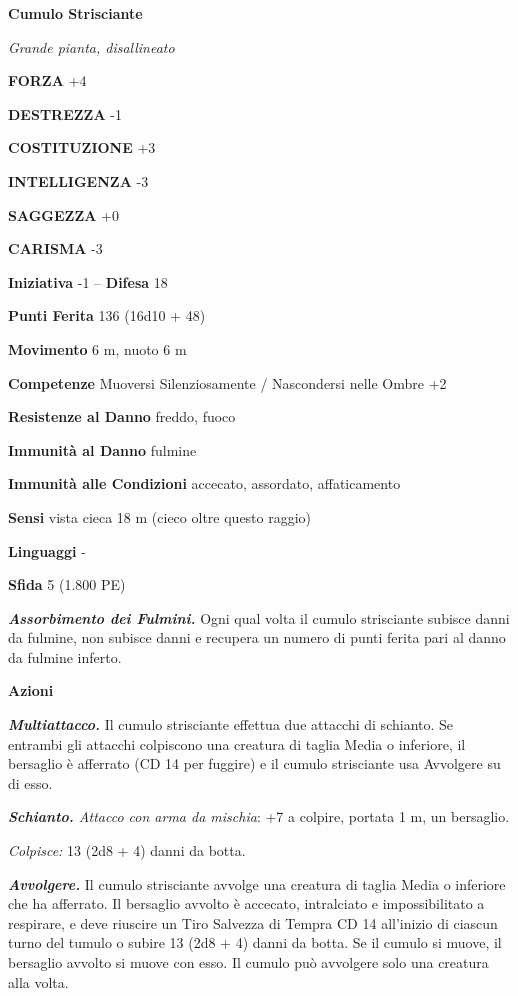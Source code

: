 \begin{multicols}{2}
\medskip{}\textbf{Cumulo Strisciante}

\emph{Grande pianta, disallineato}

\textbf{FORZA} +4

\textbf{DESTREZZA} -1

\textbf{COSTITUZIONE} +3

\textbf{INTELLIGENZA} -3

\textbf{SAGGEZZA} +0

\textbf{CARISMA} -3

\textbf{Iniziativa} -1 -- \textbf{Difesa} 18

\textbf{Punti Ferita} 136 (16d10 + 48)

\textbf{Movimento} 6 m, nuoto 6 m

\textbf{Competenze} Muoversi Silenziosamente / Nascondersi nelle Ombre +2

\textbf{Resistenze al Danno} freddo, fuoco

\textbf{Immunità al Danno} fulmine

\textbf{Immunità alle Condizioni} accecato, assordato, affaticamento

\textbf{Sensi} vista cieca 18 m (cieco oltre questo raggio)

\textbf{Linguaggi} -

\textbf{Sfida} 5 (1.800 PE)

\emph{\textbf{Assorbimento dei Fulmini.}} Ogni qual volta il cumulo strisciante subisce danni da fulmine, non subisce danni e recupera un numero di punti ferita pari al danno da fulmine inferto.

\textbf{Azioni}

\emph{\textbf{Multiattacco.}} Il cumulo strisciante effettua due attacchi di schianto. Se entrambi gli attacchi colpiscono una creatura di taglia Media o inferiore, il bersaglio è afferrato (CD 14 per fuggire) e il cumulo strisciante usa Avvolgere su di esso.

\emph{\textbf{Schianto.} Attacco con arma da mischia}: +7 a colpire, portata 1 m, un bersaglio.

\emph{Colpisce:} 13 (2d8 + 4) danni da botta.

\emph{\textbf{Avvolgere.}} Il cumulo strisciante avvolge una creatura di taglia Media o inferiore che ha afferrato. Il bersaglio avvolto è accecato, intralciato e impossibilitato a respirare, e deve riuscire un Tiro Salvezza di Tempra CD 14 all'inizio di ciascun turno del tumulo o subire 13 (2d8 + 4) danni da botta. Se il cumulo si muove, il bersaglio avvolto si muove con esso. Il cumulo può avvolgere solo una creatura alla volta.


\end{multicols}

